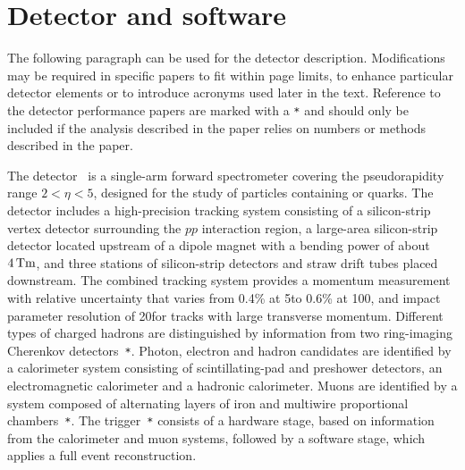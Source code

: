 \section{Detector and software}
\label{sec:Detector}
The following paragraph can be used for the detector
description. Modifications may be required in specific papers to fit
within page limits, to enhance particular detector elements or to
introduce acronyms used later in the text.
Reference to the detector performance papers are marked with a \verb!*!
and should only be included if the analysis described in the paper
relies on numbers or methods described in the paper.

The \lhcb detector~\cite{Alves:2008zz} is a single-arm forward
spectrometer covering the \mbox{pseudorapidity} range $2<\eta <5$,
designed for the study of particles containing \bquark or \cquark
quarks. The detector includes a high-precision tracking system
consisting of a silicon-strip vertex detector surrounding the $pp$
interaction region, a large-area silicon-strip detector located
upstream of a dipole magnet with a bending power of about
$4{\rm\,Tm}$, and three stations of silicon-strip detectors and straw
drift tubes placed downstream.
The combined tracking system provides a momentum measurement with
relative uncertainty that varies from 0.4\% at 5\gevc to 0.6\% at 100\gevc,
and impact parameter resolution of 20\mum for
tracks with large transverse momentum. Different types of charged hadrons are distinguished by information
from two ring-imaging Cherenkov detectors~\cite{LHCb-DP-2012-003}\verb!*!. Photon, electron and
hadron candidates are identified by a calorimeter system consisting of
scintillating-pad and preshower detectors, an electromagnetic
calorimeter and a hadronic calorimeter. Muons are identified by a
system composed of alternating layers of iron and multiwire
proportional chambers~\cite{LHCb-DP-2012-002}\verb!*!.
The trigger~\cite{LHCb-DP-2012-004}\verb!*! consists of a
hardware stage, based on information from the calorimeter and muon
systems, followed by a software stage, which applies a full event
reconstruction.

